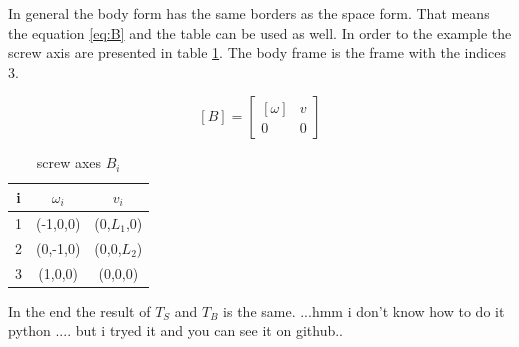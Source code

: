 In general the body form has the same borders as the space form. That means the equation \ref{eq:B} and the table can be used as well. In order to the example the screw axis are presented in table \ref{tab:screwB}. The body frame is the frame with the indices 3.

\begin{equation} \label{eq:B}
    [B] =
    \begin{bmatrix}
        [\omega] &  v \\
        0 & 0
    \end{bmatrix} 
\end{equation}
\begin{table}[h] 
    \centering
    \begin{tabular}{c||c|c}
         i & $\omega_i$ & $v_i$\\
         \hline
         1 & (-1,0,0) & (0,$L_1$,0)\\
         \hline
         2 & (0,-1,0) & (0,0,$L_2$)\\
         \hline
         3 & (1,0,0) & (0,0,0)\\
    \end{tabular}
    \caption{screw axes $B_i$}
    \label{tab:screwB}
\end{table}

In the end the result of $T_S$ and $T_B$ is the same. 
...hmm i don't know how to do it python .... 
but i tryed it and you can see it on github..

